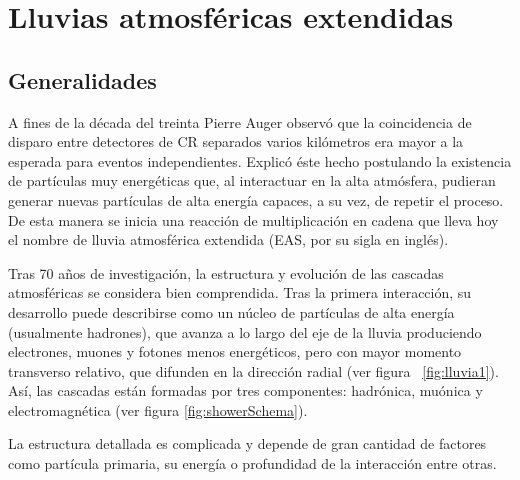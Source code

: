 \chapter{Lluvias atmosf\'ericas extendidas}
\label{ch:easAuger}

\section{Generalidades}

A fines de la década del treinta Pierre Auger observó que la coincidencia de disparo entre detectores de CR separados varios kilómetros era mayor a la esperada para eventos independientes. Explicó éste hecho postulando la existencia de partículas muy energéticas que, al interactuar  en la alta atmósfera, pudieran generar nuevas partículas de alta energía capaces, a su vez, de repetir el proceso. De esta manera se inicia una reacción de multiplicación en cadena que lleva hoy el nombre de lluvia atmosférica extendida (EAS, por su sigla en inglés). 

Tras 70 años de investigación, la estructura y evolución de las cascadas atmosféricas se considera bien comprendida.
Tras la primera interacción, su desarrollo puede describirse como un núcleo de partículas de alta energía (usualmente hadrones), que avanza a lo largo del eje de la lluvia produciendo electrones, muones y fotones menos energéticos, pero con mayor momento transverso relativo, que difunden en la dirección radial (ver figura ~\ref{fig:lluvia1}). Así, las cascadas están formadas por tres componentes: hadrónica, muónica y electromagnética (ver figura \ref{fig:showerSchema}).

La estructura detallada es complicada y depende de gran cantidad de factores como partícula primaria, su energ\'ia o profundidad de la interacción entre otras.

